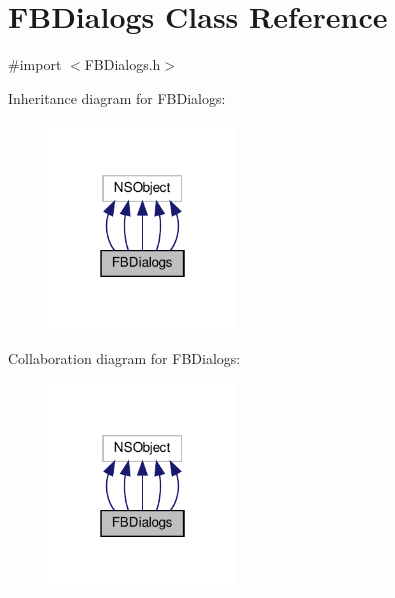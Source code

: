 \hypertarget{interfaceFBDialogs}{}\section{F\+B\+Dialogs Class Reference}
\label{interfaceFBDialogs}


{\ttfamily \#import $<$F\+B\+Dialogs.\+h$>$}



Inheritance diagram for F\+B\+Dialogs\+:
\nopagebreak
\begin{figure}[H]
\begin{center}
\leavevmode
\includegraphics[width=142pt]{interfaceFBDialogs__inherit__graph}
\end{center}
\end{figure}


Collaboration diagram for F\+B\+Dialogs\+:
\nopagebreak
\begin{figure}[H]
\begin{center}
\leavevmode
\includegraphics[width=142pt]{interfaceFBDialogs__coll__graph}
\end{center}
\end{figure}

